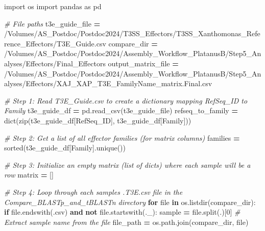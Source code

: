 \documentclass[
]{book}
\newenvironment{Shaded}{\begin{snugshade}}{\end{snugshade}}
\newcommand{\BuiltInTok}[1]{#1}
\newcommand{\CommentTok}[1]{\textcolor[rgb]{0.56,0.35,0.01}{\textit{#1}}}
\newcommand{\ControlFlowTok}[1]{\textcolor[rgb]{0.13,0.29,0.53}{\textbf{#1}}}
\newcommand{\DecValTok}[1]{\textcolor[rgb]{0.00,0.00,0.81}{#1}}
\newcommand{\ImportTok}[1]{#1}
\newcommand{\KeywordTok}[1]{\textcolor[rgb]{0.13,0.29,0.53}{\textbf{#1}}}
\newcommand{\NormalTok}[1]{#1}
\newcommand{\OperatorTok}[1]{\textcolor[rgb]{0.81,0.36,0.00}{\textbf{#1}}}
\newcommand{\StringTok}[1]{\textcolor[rgb]{0.31,0.60,0.02}{#1}}
\begin{document}
\begin{Shaded}
\begin{Highlighting}[]
\ImportTok{import}\NormalTok{ os}
\ImportTok{import}\NormalTok{ pandas }\ImportTok{as}\NormalTok{ pd}

\CommentTok{\# File paths}
\NormalTok{t3e\_guide\_file }\OperatorTok{=} \StringTok{\textquotesingle{}/Volumes/AS\_Postdoc/Postdoc2024/T3SS\_Effectors/T3SS\_Xanthomonas\_Reference\_Effectors/T3E\_Guide.csv\textquotesingle{}}
\NormalTok{compare\_dir }\OperatorTok{=} \StringTok{\textquotesingle{}/Volumes/AS\_Postdoc/Postdoc2024/Assembly\_Workflow\_PlatanusB/Step5\_Analyses/Effectors/Final\_Effectors\textquotesingle{}}
\NormalTok{output\_matrix\_file }\OperatorTok{=} \StringTok{\textquotesingle{}/Volumes/AS\_Postdoc/Postdoc2024/Assembly\_Workflow\_PlatanusB/Step5\_Analyses/Effectors/XAJ\_XAP\_T3E\_FamilyName\_matrix.Final.csv\textquotesingle{}}

\CommentTok{\# Step 1: Read T3E\_Guide.csv to create a dictionary mapping RefSeq\_ID to Family}
\NormalTok{t3e\_guide\_df }\OperatorTok{=}\NormalTok{ pd.read\_csv(t3e\_guide\_file)}
\NormalTok{refseq\_to\_family }\OperatorTok{=} \BuiltInTok{dict}\NormalTok{(}\BuiltInTok{zip}\NormalTok{(t3e\_guide\_df[}\StringTok{\textquotesingle{}RefSeq\_ID\textquotesingle{}}\NormalTok{], t3e\_guide\_df[}\StringTok{\textquotesingle{}Family\textquotesingle{}}\NormalTok{]))}

\CommentTok{\# Step 2: Get a list of all effector families (for matrix columns)}
\NormalTok{families }\OperatorTok{=} \BuiltInTok{sorted}\NormalTok{(t3e\_guide\_df[}\StringTok{\textquotesingle{}Family\textquotesingle{}}\NormalTok{].unique())}

\CommentTok{\# Step 3: Initialize an empty matrix (list of dicts) where each sample will be a row}
\NormalTok{matrix }\OperatorTok{=}\NormalTok{ []}

\CommentTok{\# Step 4: Loop through each sample\textquotesingle{}s .T3E.csv file in the Compare\_BLASTp\_and\_tBLASTn directory}
\ControlFlowTok{for} \BuiltInTok{file} \KeywordTok{in}\NormalTok{ os.listdir(compare\_dir):}
    \ControlFlowTok{if} \BuiltInTok{file}\NormalTok{.endswith(}\StringTok{\textquotesingle{}.csv\textquotesingle{}}\NormalTok{) }\KeywordTok{and} \KeywordTok{not} \BuiltInTok{file}\NormalTok{.startswith(}\StringTok{\textquotesingle{}.\_\textquotesingle{}}\NormalTok{):}
\NormalTok{        sample }\OperatorTok{=} \BuiltInTok{file}\NormalTok{.split(}\StringTok{\textquotesingle{}.\textquotesingle{}}\NormalTok{)[}\DecValTok{0}\NormalTok{]  }\CommentTok{\# Extract sample name from the file}
\NormalTok{        file\_path }\OperatorTok{=}\NormalTok{ os.path.join(compare\_dir, }\BuiltInTok{file}\NormalTok{)}
        

\end{Highlighting}
\end{Shaded}
\end{document}
